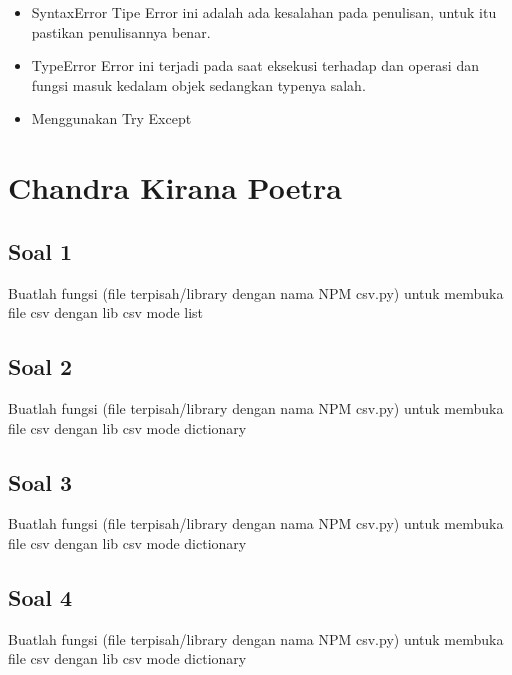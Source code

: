 \begin{enumerate}
\begin{itemize}
\item SyntaxError
Tipe Error ini adalah ada kesalahan pada penulisan, untuk itu pastikan penulisannya benar.

\item TypeError
Error ini terjadi pada saat eksekusi terhadap dan operasi dan fungsi masuk kedalam objek sedangkan typenya salah.

\item Menggunakan Try Except 


\end{itemize}

\section{Chandra Kirana Poetra}

\subsection{Soal 1}
Buatlah fungsi (file terpisah/library dengan nama NPM csv.py) untuk membuka file csv dengan lib csv mode list


\subsection{Soal 2}
Buatlah fungsi (file terpisah/library dengan nama NPM csv.py) untuk membuka file csv dengan lib csv mode dictionary


\subsection{Soal 3}
Buatlah fungsi (file terpisah/library dengan nama NPM csv.py) untuk membuka file csv dengan lib csv mode dictionary


\subsection{Soal 4}
Buatlah fungsi (file terpisah/library dengan nama NPM csv.py) untuk membuka file csv dengan lib csv mode dictionary



\end{enumerate}
